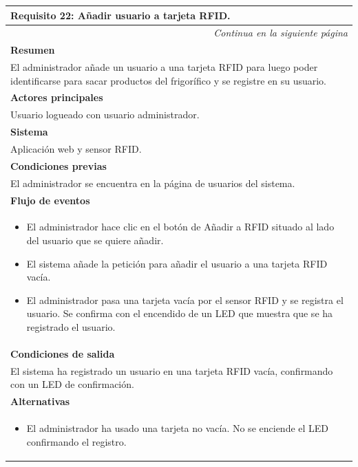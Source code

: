 \begin{longtable}{|p{}|}
\hline
  \rowcolor[gray]{.5}
 \color{white}\textbf{Requisito 22: Añadir usuario a tarjeta RFID.} \\
\hline
\endfirsthead
\endhead
\hline \multicolumn{1}{r}{\textit{Continua en la siguiente página}} \\
\endfoot
\endlastfoot
    \rowcolor[gray]{.9}
     \textbf{Resumen} \\
     \hline
     El administrador añade un usuario a una tarjeta RFID para luego poder identificarse para sacar productos del frigorífico y se registre en su usuario. \\
     \hline
     \rowcolor[gray]{.9}
     \textbf{Actores principales} \\
     \hline
     Usuario logueado con usuario administrador. \\
     \hline
     \rowcolor[gray]{.9}
     \textbf{Sistema} \\
     \hline
     Aplicación web y sensor RFID. \\
     \hline
     \rowcolor[gray]{.9}
     \textbf{Condiciones previas} \\
     \hline
     El administrador se encuentra en la página de usuarios del sistema. \\
     \hline
     \rowcolor[gray]{.9}
     \textbf{Flujo de eventos}  \\
     \hline
    \begin{itemize}
         \item El administrador hace clic en el botón de Añadir a RFID situado al lado del usuario que se quiere añadir.
         \item El sistema añade la petición para añadir el usuario a una tarjeta RFID vacía.
         \item El administrador pasa una tarjeta vacía por el sensor RFID y se registra el usuario. Se confirma con el encendido de un LED que muestra que se ha registrado el usuario.
     \end{itemize} \\
     \hline
     \rowcolor[gray]{.9}
     \textbf{Condiciones de salida} \\
     \hline
     El sistema ha registrado un usuario en una tarjeta RFID vacía, confirmando con un LED de confirmación. \\
     \hline
     \rowcolor[gray]{.9}
     \textbf{Alternativas}  \\
     \hline
      \begin{itemize}
         \item El administrador ha usado una tarjeta no vacía. No se enciende el LED confirmando el registro.
     \end{itemize} \\
     \hline
\end{longtable}

